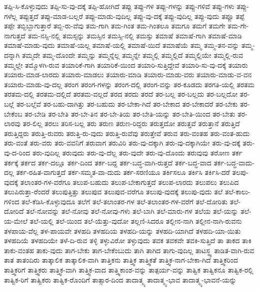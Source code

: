 {ತಪ್ಪಿ-ಸಿ-ಕೊಳ್ಳುವುದು
ತಪ್ಪಿ-ಸು-ವು-ದಕ್ಕೆ
ತಪ್ಪಿ-ಹೋಗಿದೆ
ತಪ್ಪು
ತಪ್ಪು-ಗಳ
ತಪ್ಪು-ಗಳನ್ನು
ತಪ್ಪು-ಗಳಿವೆ
ತಪ್ಪು-ಗಳು
ತಪ್ಪು-ಗಳೆಲ್ಲ
ತಪ್ಪುತ್ತದೆ
ತಪ್ಪು-ಮಾಡ-ಬಲ್ಲರೆ
ತಪ್ಪು-ಮಾಡು-ವುದಿಲ್ಲ
ತಪ್ಪು-ವು-ದಕ್ಕೆ
ತಪ್ಪು-ವುದಿಲ್ಲ
ತಪ್ಪು-ವುದು
ತಪ್ಪೂ
ತಪ್ಪೆ
ತಪ್ಪೇ
ತಬ್ಬಿಬ್ಬಾಗುತ್ತಾರೆ
ತಬ್ಬಿ-ರು-ವೆವು
ತಮ-ಗಾಗಿ
ತಮ-ಗಿಂತ
ತಮ-ಗಿಂತಲೂ
ತಮಗೂ
ತಮಗೆ
ತಮಗೇ
ತಮ-ಗೇ-ನಾಗುತ್ತದೆ
ತಮ-ನಸ್ಸಿ-ನಲ್ಲಿ
ತಮಸ್ಸನ್ನು
ತಮಸ್ಸಿನ
ತಮಸ್ಸಿ-ನಲ್ಲಿ
ತಮಸ್ಸು
ತಮಾಷೆ
ತಮಾಷೆ-ಗಾಗಿ
ತಮಾಷೆ-ಮಾಡಿ
ತಮಾಷೆ-ಮಾಡು-ವುದು
ತಮಾಷೆ-ಯಲ್ಲ
ತಮಾಷೆ-ಯಲ್ಲಿ
ತಮಾಷೆ-ಯಿದೆ
ತಮಾಷೆಯೆ
ತಮ್ಮ
ತಮ್ಮ-ತನ-ವನ್ನು
ತಮ್ಮ-ದನ್ನಾಗಿ
ತಮ್ಮದೇ
ತಮ್ಮ-ದೊಂದೇ
ತಮ್ಮನ್ನು
ತಮ್ಮನ್ನೆಲ್ಲ
ತಮ್ಮನ್ನೇ
ತಮ್ಮಲ್ಲಿ
ತಮ್ಮಲ್ಲಿದೆ
ತಮ್ಮಲ್ಲಿಯೇ
ತಮ್ಮಲ್ಲಿ-ರುವ
ತಮ್ಮಲ್ಲೇ
ತಮ್ಮೊಳಗಿ-ರುವ
ತಯಾರಿಕೆ-ಗಾಗಿ
ತಯಾರಿಕೆ-ಯಿಂದ
ತಯಾರಿ-ಸುತ್ತಿದ್ದೇವೆ
ತಯಾರಿ-ಸು-ವು-ದಕ್ಕೆ
ತಯಾರು
ತಯಾರು-ಮಾಡ-ಲಾರದು
ತಯಾರು-ಮಾಡಲು
ತಯಾರು-ಮಾಡಿ
ತಯಾರು-ಮಾಡು-ವರು
ತಯಾರು-ಮಾಡು-ವ-ವನ
ತಯಾರು-ಮಾಡು-ವು-ದಲ್ಲ
ತರಂಗ
ತರಂಗ-ಗಳನ್ನು
ತರಂಗ-ದಲ್ಲಿ
ತರಂಗ-ವನ್ನು
ತರ-ಕೂಡದು
ತರಗತಿ-ಯಲ್ಲಿ
ತರತಮ
ತರತಮ-ದಲ್ಲಿ
ತರತಮ-ದಲ್ಲಿದೆ
ತರತಮ-ವಲ್ಲದೆ
ತರದ
ತರದು
ತರದೆ
ತರ-ಬಲ್ಲ
ತರ-ಬಲ್ಲದು
ತರ-ಬಲ್ಲದೋ
ತರ-ಬಲ್ಲೆ
ತರ-ಬಲ್ಲೆವೆ
ತರ-ಬಹು-ದಾಗಿತ್ತು
ತರ-ಬಹುದು
ತರ-ಬೇಕಾ-ಗಿದೆ
ತರ-ಬೇಕಾದ
ತರ-ಬೇಕಾದರೆ
ತರ-ಬೇಕು
ತರ-ಬೇಕೆಂಬ
ತರ-ಬೇಡಿ
ತರ-ಬೇತಿ
ತರ-ಬೇ-ತಿನ
ತರ-ಬೇ-ತಿಯ
ತರ-ಬೇತಿ-ಯನ್ನು
ತರ-ಬೇತಿ-ಯಿಂದ
ತರ-ಬೇತು
ತರ-ಲಾರವು
ತರ-ಲಿಲ್ಲ
ತರಲು
ತರಿಸ-ಬಲ್ಲ
ತರು
ತರುಣ
ತರುಣ-ರಿದ್ದರು
ತರುತ್ತದೋ
ತರುತ್ತವೆ
ತರುತ್ತಾನೆ
ತರುತ್ತಿದೆ
ತರುತ್ತಿದ್ದರು
ತರುತ್ತಿ-ರುವರು
ತರುತ್ತಿ-ರು-ವುದು
ತರುತ್ತಿ-ರುವೆವು
ತರುತ್ತೇವೆ
ತರುವ
ತರು-ವಂತಹ
ತರು-ವಂತ-ಹುದು
ತರು-ವಂತೆ
ತರು-ವರು
ತರು-ವವನಿಗೆ
ತರುವಾಗ
ತರುವಿರಿ
ತರು-ವು-ದಕ್ಕಾಗಿ
ತರು-ವು-ದಕ್ಕಾಗಿಯೇ
ತರು-ವು-ದಕ್ಕೆ
ತರು-ವು-ದ-ರಿಂದ
ತರು-ವುದಿಲ್ಲ
ತರುವುದು
ತರು-ವು-ದೆಲ್ಲ
ತರು-ವುದೇ
ತರು-ವು-ದೊಂದು
ತರುವುವು
ತರೋಣ
ತರ್ಕ
ತರ್ಕಕ್ಕೆ
ತರ್ಕದ
ತರ್ಕ-ದಲ್ಲೂ
ತರ್ಕ-ದಿಂದ
ತರ್ಕ-ಬದ್ದ
ತರ್ಕ-ಬದ್ಧ-ವಾಗಿ-ರುತ್ತದೆ
ತರ್ಕ-ಬದ್ಧ-ವಾದ
ತರ್ಕ-ಬದ್ಧ-ವಾದು-ದಲ್ಲ
ತರ್ಕ-ರಹಿತ-ವಾಗುತ್ತದೆ
ತರ್ಕ-ಸಮ್ಮತ-ವಾ-ದುದು
ತರ್ಕ-ಸರಣಿಯೂ
ತರ್ಕಿಸಲೂ
ತರ್ಕಿಸಿ
ತರ್ಕಿಸಿ-ದರೆ
ತಲಪು-ವುದಕ್ಕೆ
ತಲಾಂತರ-ಗಳ-ವರೆಗೂ
ತಲುಪ-ಬಹುದು
ತಲುಪ-ಬೇಕಾಗುತ್ತದೆ
ತಲುಪ-ಲಾರದು
ತಲುಪಲು
ತಲುಪಿದ
ತಲುಪಿರುತ್ತಾ-ರೆಂದರೆ
ತಲುಪುತ್ತಿತ್ತು
ತಲುಪುವ
ತಲುಪುವ-ವರೆಗೂ
ತಲುಪು-ವುದಕ್ಕೆ
ತಲುಪು-ವುದು
ತಲೆ
ತಲೆ-ಕಾಲು-ಗಳಿಂದ
ತಲೆ-ಕೆಡಿಸಿ-ಕೊಳ್ಳುವುದೂ
ತಲೆಗೆ
ತಲೆ-ತಲಾಂತರ-ಗಳ
ತಲೆ-ತಲಾಂತರ-ಗಳ-ವರೆಗೆ
ತಲೆ-ದೋರಿತು
ತಲೆ-ದೋರಿದೆ
ತಲೆ-ನೋವನ್ನು
ತಲೆ-ನೋವು
ತಲೆ-ನೋವು-ಗಳು
ತಲೆ-ಬಾಗಿ
ತಲೆ-ಮಾರು-ಗಳ
ತಲೆಯ
ತಲೆ-ಯನ್ನು
ತಲೆ-ಯ-ಮೇಲೆ
ತಲೆ-ಯಲ್ಲಿ
ತಲೆ-ಯಿಂದ
ತಲೆ-ಯೆತ್ತು-ವುದೋ
ತಲ್ಲಣಿ-ಸಿದರೂ
ತಲ್ಲೀನ-ನಾಗಿ
ತಲ್ಲೀನ-ನಾಗಿ-ರುವನು
ತಳಪಾಯ-ವೆಲ್ಲ
ತಳ-ಪಾಯವೇ
ತಳಹದಿ
ತಳಹದಿಯ
ತಳಹದಿ-ಯನ್ನು
ತಳಹದಿ-ಯಾಗಿದೆ
ತಳಹದಿ-ಯಾ-ಯಿತು
ತಳಹದಿಯೆ
ತಳಹದಿಯೇ
ತಳೆ-ದಿ-ರುವ
ತಳ್ಳಿ
ತಳ್ಳುವಿರೋ
ತಳ್ಳುವುದು
ತವಕ
ತವಕವೇ
ತವಕಿ-ಸುತ್ತಿದೆ
ತಾ
ತಾಕದ
ತಾಕಿ
ತಾಕು-ವಂತಹ
ತಾಕು-ವುದು
ತಾಗ-ಬೇಕು
ತಾಗ-ಬೇಕೆಂಬುದು
ತಾಗಿ
ತಾಗಿದ
ತಾಗು-ವುದಿಲ್ಲ
ತಾಟಸ್ಥ್ಯ
ತಾಡಿತ-ವಾಗಿ-ರುವ
ತಾತ
ತಾತಂದಿರು
ತಾತ್ಕಾಲಿಕ
ತಾತ್ಕಾಲಿಕ-ವಾಗಿ
ತಾತ್ತಿಕನು
ತಾತ್ತ್ವಿಕ
ತಾತ್ತ್ವಿಕತೆ
ತಾತ್ತ್ವಿಕ-ನಾಗ-ಬೇಕಾ-ಗಿದೆ
ತಾತ್ತ್ವಿಕರಿಂದ
ತಾತ್ತ್ವಿಕರಿಗೆ
ತಾತ್ತ್ವಿಕರು
ತಾತ್ತ್ವಿಕ-ವಾಗಿ
ತಾತ್ತ್ವಿಕ-ವಾದ
ತಾತ್ತ್ವಿಕಾಂಶ-ವನ್ನು
ತಾತ್ಪರ್ಯ-ವನ್ನು
ತಾತ್ವಿಕ
ತಾತ್ವಿಕನೂ
ತಾತ್ವಿಕ-ರಲ್ಲಿ
ತಾತ್ವಿಕ-ರಿಗೆ
ತಾತ್ವಿಕರು
ತಾತ್ವಿಕ-ರೊಂದಿಗೆ
ತಾತ್ಸಾರ-ದಿಂದ
ತಾದಾತ್ಮ್ಯ
ತಾದಾತ್ಮ್ಯ-ಭಾವ
ತಾದಾತ್ಮ್ಯ-ಭಾವನೆ-ಯನ್ನು
}
